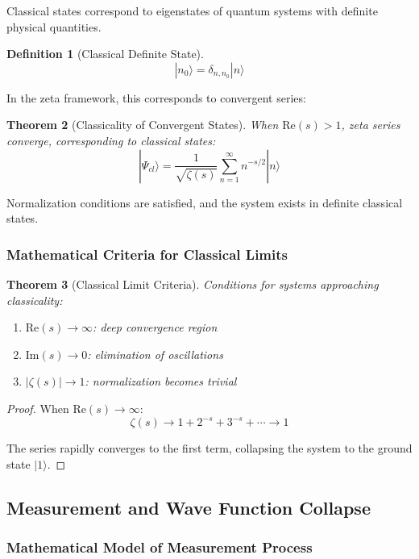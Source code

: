 \documentclass[11pt]{article}
\theoremstyle{plain}
\newtheorem{theorem}{Theorem}[section]
\theoremstyle{definition}
\newtheorem{definition}[theorem]{Definition}
\theoremstyle{remark}
\begin{document}
Classical states correspond to eigenstates of quantum systems with definite physical quantities.

\begin{definition}[Classical Definite State]
$$|n_0\rangle = \delta_{n,n_0} |n\rangle$$
\end{definition}

In the zeta framework, this corresponds to convergent series:

\begin{theorem}[Classicality of Convergent States]
When $\text{Re}(s) > 1$, zeta series converge, corresponding to classical states:
$$|\Psi_{cl}\rangle = \frac{1}{\sqrt{\zeta(s)}} \sum_{n=1}^{\infty} n^{-s/2} |n\rangle$$
\end{theorem}

Normalization conditions are satisfied, and the system exists in definite classical states.

\subsubsection{Mathematical Criteria for Classical Limits}

\begin{theorem}[Classical Limit Criteria]
Conditions for systems approaching classicality:
\begin{enumerate}
\item $\text{Re}(s) \to \infty$: deep convergence region
\item $\text{Im}(s) \to 0$: elimination of oscillations
\item $|\zeta(s)| \to 1$: normalization becomes trivial
\end{enumerate}
\end{theorem}

\begin{proof}
When $\text{Re}(s) \to \infty$:
$$\zeta(s) \to 1 + 2^{-s} + 3^{-s} + \cdots \to 1$$

The series rapidly converges to the first term, collapsing the system to the ground state $|1\rangle$.
\end{proof}

\subsection{Measurement and Wave Function Collapse}

\subsubsection{Mathematical Model of Measurement Process}
\end{document}
